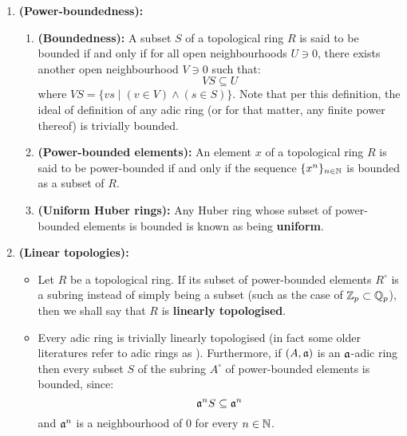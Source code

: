                 \begin{definition} \label{def: power_bounded_elements}
                    \noindent
                    \begin{enumerate}
                        \item \textbf{(Power-boundedness):} 
                            \begin{enumerate}
                                \item \textbf{(Boundedness):} A subset $S$ of a topological ring $R$ is said to be bounded if and only if for all open neighbourhoods $U \ni 0$, there exists another open neighbourhood $V \ni 0$ such that:
                                    $$VS \subseteq U$$
                                where $VS = \{v s \mid (v \in V) \wedge (s \in S)\}$. Note that per this definition, the ideal of definition of any adic ring (or for that matter, any finite power thereof) is trivially bounded. 
                                \item \textbf{(Power-bounded elements):} An element $x$ of a topological ring $R$ is said to be power-bounded if and only if the sequence $\{x^n\}_{n \in \mathbb{N}}$ is bounded as a subset of $R$.
                                \item \textbf{(Uniform Huber rings):} Any Huber ring whose subset of power-bounded elements is bounded is known as being \textbf{uniform}.
                            \end{enumerate}
                        \item \textbf{(Linear topologies):} 
                            \begin{itemize}
                                \item Let $R$ be a topological ring. If its subset of power-bounded elements $R^{\circ}$ is a subring instead of simply being a subset (such as the case of $\mathbb{Z}_p \subset \mathbb{Q}_p$), then we shall say that $R$ is \textbf{linearly topologised}. 
                                \item Every adic ring is trivially linearly topologised (in fact some older literatures refer to adic rings as ). Furthermore, if $(A, \mathfrak{a})$ is an $\mathfrak{a}$-adic ring then every subset $S$ of the subring $A^{\circ}$ of power-bounded elements is bounded, since:
                                    $$\mathfrak{a}^n S \subseteq \mathfrak{a}^n$$
                                and $\mathfrak{a}^n$ is a neighbourhood of $0$ for every $n \in \mathbb{N}$. 
                            \end{itemize}
                    \end{enumerate}
                \end{definition}
                
